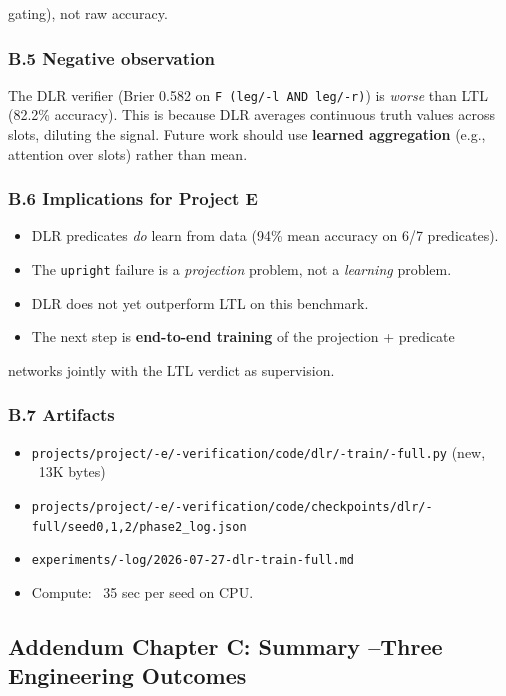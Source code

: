 \documentclass[11pt]{article}
\begin{document}
  gating), not raw accuracy.

\subsubsection{B.5 Negative observation}

The DLR verifier (Brier 0.582 on \texttt{F (leg/-l AND leg/-r)}) is \textit{worse} than LTL
(82.2\% accuracy). This is because DLR averages continuous truth values across
slots, diluting the signal. Future work should use \textbf{learned aggregation}
(e.g., attention over slots) rather than mean.

\subsubsection{B.6 Implications for Project E}

\begin{itemize}
  \item DLR predicates \textit{do} learn from data (94\% mean accuracy on 6/7 predicates).
  \item The \texttt{upright} failure is a \textit{projection} problem, not a \textit{learning} problem.
  \item DLR does not yet outperform LTL on this benchmark.
  \item The next step is \textbf{end-to-end training} of the projection + predicate
\end{itemize}

  networks jointly with the LTL verdict as supervision.

\subsubsection{B.7 Artifacts}

\begin{itemize}
  \item \texttt{projects/project/-e/-verification/code/dlr/-train/-full.py} (new, ~13K bytes)
  \item \texttt{projects/project/-e/-verification/code/checkpoints/dlr/-full/seed{0,1,2}/phase2\_log.json}
  \item \texttt{experiments/-log/2026-07-27-dlr-train-full.md}
  \item Compute: ~35 sec per seed on CPU.
\end{itemize}


\hrulefill

\subsection{Addendum Chapter C: Summary --Three Engineering Outcomes}
\end{document}
